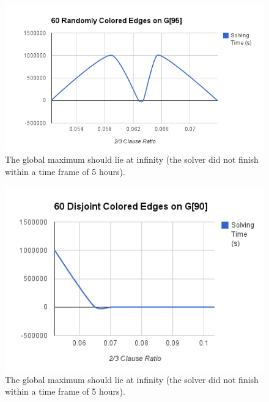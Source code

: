 \documentclass[paper=a4, fontsize=11pt]{scrartcl} %
\begin{document}
\begin{figure}
\begin{center}
\includegraphics[scale=0.75]{chart_3.png}
\end{center}
\caption{The global maximum should lie at infinity (the solver did not finish within a time frame of 5 hours).} 
\label{f3}
\end{figure}

\begin{figure}
\begin{center}
\includegraphics[scale=0.75]{chart_4.png}
\end{center}
\caption{The global maximum should lie at infinity (the solver did not finish within a time frame of 5 hours).} 
\label{f4}
\end{figure}
\end{document}
